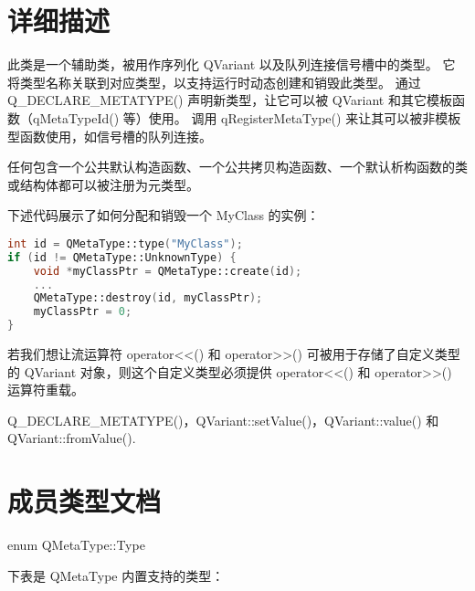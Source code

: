 \section{详细描述}

此类是一个辅助类，被用作序列化 QVariant 以及队列连接信号槽中的类型。
它将类型名称关联到对应类型，以支持运行时动态创建和销毁此类型。
通过 Q\_DECLARE\_METATYPE() 声明新类型，让它可以被 QVariant 和其它模板函数（qMetaTypeId() 等）使用。
调用 qRegisterMetaType() 来让其可以被非模板型函数使用，如信号槽的队列连接。

任何包含一个公共默认构造函数、一个公共拷贝构造函数、一个默认析构函数的类或结构体都可以被注册为元类型。

下述代码展示了如何分配和销毁一个 MyClass 的实例：

\begin{lstlisting}[language=C++]
int id = QMetaType::type("MyClass");
if (id != QMetaType::UnknownType) {
    void *myClassPtr = QMetaType::create(id);
    ...
    QMetaType::destroy(id, myClassPtr);
    myClassPtr = 0;
}
\end{lstlisting}

若我们想让流运算符 operator<<() 和 operator>>() 可被用于存储了自定义类型的 QVariant 对象，则这个自定义类型必须提供 operator<<() 和 operator>>() 运算符重载。

\begin{seeAlso}
Q\_DECLARE\_METATYPE()，QVariant::setValue()，QVariant::value() 和 QVariant::fromValue().
\end{seeAlso}

\section{成员类型文档}

enum QMetaType::Type

下表是 QMetaType 内置支持的类型：


